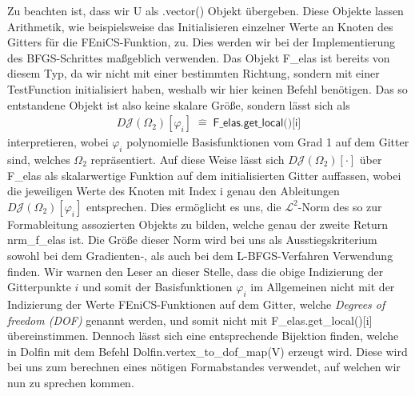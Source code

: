 Zu beachten ist, dass wir \textsf{U} als \textsf{.vector()} Objekt übergeben. Diese Objekte lassen Arithmetik, wie beispielsweise das Initialisieren einzelner Werte an Knoten des Gitters für die FEniCS-Funktion, zu. Dies werden wir bei der Implementierung des BFGS-Schrittes maßgeblich verwenden. Das Objekt \textsf{F\_elas} ist bereits von diesem Typ, da wir nicht mit einer bestimmten Richtung, sondern mit einer \textsf{TestFunction} initialisiert haben, weshalb wir hier keinen Befehl benötigen. Das so entstandene Objekt ist also keine skalare Größe, sondern lässt sich als
\begin{align}\label{felas}
	D\mathcal{J}(\Omega_2)[\varphi_i] \; \hat{=}\; \textsf{F\_elas.get\_local()[i]}
\end{align}
interpretieren, wobei $\varphi_i$ polynomielle Basisfunktionen vom Grad 1 auf dem Gitter sind, welches $\Omega_2$ repräsentiert. Auf diese Weise lässt sich $D\mathcal{J}(\Omega_2)[\cdot]$ über \textsf{F\_elas} als skalarwertige Funktion auf dem initialisierten Gitter auffassen, wobei die jeweiligen Werte des Knoten mit Index \textsf{i} genau den Ableitungen $D\mathcal{J}(\Omega_2)[\varphi_i]$ entsprechen. Dies ermöglicht es uns, die $\mathcal{L}^2$-Norm des so zur Formableitung assozierten Objekts zu bilden, welche genau der zweite Return \textsf{nrm\_f\_elas} ist. 
Die Größe dieser Norm wird bei uns als Ausstiegskriterium sowohl bei dem Gradienten-, als auch bei dem L-BFGS-Verfahren Verwendung finden.
Wir warnen den Leser an dieser Stelle, dass die obige Indizierung der Gitterpunkte $i$ und somit der Basisfunktionen $\varphi_i$ im Allgemeinen nicht mit der Indizierung der Werte FEniCS-Funktionen auf dem Gitter, welche \textit{Degrees of freedom (DOF)} genannt werden, und somit nicht mit \textsf{F\_elas.get\_local()[i]} übereinstimmen. Dennoch lässt sich eine entsprechende Bijektion finden, welche in \textsf{Dolfin} mit dem Befehl \textsf{Dolfin.vertex\_to\_dof\_map(V)} erzeugt wird. Diese wird bei uns zum berechnen eines nötigen Formabstandes verwendet, auf welchen wir nun zu sprechen kommen.

